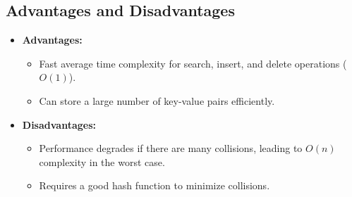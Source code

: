 \documentclass{article}
\begin{document}
\subsection{Advantages and Disadvantages}
\begin{itemize}
    \item \textbf{Advantages:}
    \begin{itemize}
        \item Fast average time complexity for search, insert, and delete operations ($O(1)$).
        \item Can store a large number of key-value pairs efficiently.
    \end{itemize}
    
    \item \textbf{Disadvantages:}
    \begin{itemize}
        \item Performance degrades if there are many collisions, leading to $O(n)$ complexity in the worst case.
        \item Requires a good hash function to minimize collisions.
    \end{itemize}
\end{itemize}
\end{document}
